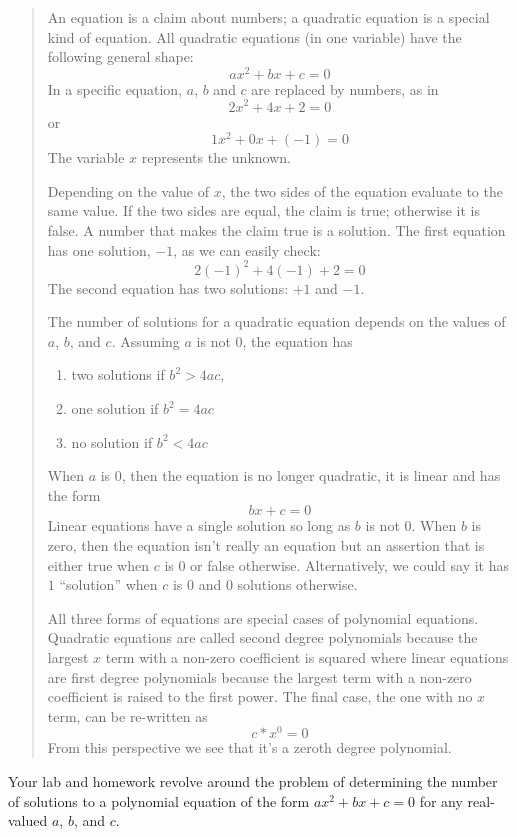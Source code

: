 \documentclass[]{tufte-handout}
\begin{document}
\begin{framed}
\begin{quote}
An equation is a claim about numbers; a quadratic equation is a special kind of equation. All quadratic equations (in one variable) have the following general shape:
\[ ax^2+bx+c=0 \]
In a specific equation, $a$, $b$ and $c$ are replaced by numbers, as in
\[ 2x^2+4x+2 = 0 \]
or
\[ 1x^2+0x+(-1) = 0 \]
The variable $x$ represents the unknown.

Depending on the value of $x$, the two sides of the equation evaluate to the same value. If the two sides are equal, the claim is true; otherwise it is false. A number that makes the claim true is a solution. The first equation has one solution, $-1$, as we can easily check:
\[ 2(-1)^2+4(-1)+2 = 0 \]
The second equation has two solutions: $+1$ and $-1$.

The number of solutions for a quadratic equation depends on the values of $a$, $b$, and $c$. Assuming $a$ is not $0$, the equation has
\begin{enumerate}
\item two solutions if $b^2 > 4ac$,

\item one solution if $b^2 = 4ac$

\item no solution if $b^2 < 4ac$
\end{enumerate}

When $a$ is $0$, then the equation is no longer quadratic, it is linear and has the form
\[ bx + c = 0 \]
Linear equations have a single solution so long as $b$ is not $0$. When $b$ is zero, then the equation isn't really an equation but an assertion that is either true when $c$ is $0$ or false otherwise. Alternatively, we could say it has $1$ ``solution'' when $c$ is 0 and $0$ solutions otherwise.  

All three forms of equations are special cases of polynomial equations. Quadratic equations are called second degree polynomials because the largest $x$ term with a non-zero coefficient is squared where linear equations are first degree polynomials because the largest term with a non-zero coefficient is raised to the first power. The final case, the one with no $x$ term, can be re-written as
\[ c*x^0 = 0 \]
From this perspective we see that it's a zeroth degree polynomial.  
\end{quote}
\end{framed}

Your lab and homework revolve around the problem of determining the number of solutions to a polynomial equation of the form $ax^2+bx+c=0$ for any real-valued  $a$, $b$, and $c$. 
\end{document}
